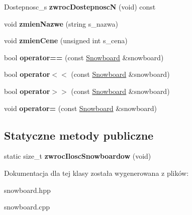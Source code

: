 \begin{DoxyCompactItemize}
\mbox{\label{class_snowboard_aaa30ba4f895aebff920ac25c5d477fd8}} 
Dostepnosc\+\_\+s {\bfseries zwroc\+DostepnoscN} (void) const
\item 
\mbox{\label{class_snowboard_a82357c21c3b6db16705afc871e79ee55}} 
void {\bfseries zmien\+Nazwe} (string s\+\_\+nazwa)
\item 
\mbox{\label{class_snowboard_a4a85e0a9b666ec2684bd924fb462948e}} 
void {\bfseries zmien\+Cene} (unsigned int s\+\_\+cena)
\item 
\mbox{\label{class_snowboard_aa8da85ff612a1916b31a281b54a134cc}} 
bool {\bfseries operator==} (const \hyperlink{class_snowboard}{Snowboard} \&snowboard)
\item 
\mbox{\label{class_snowboard_a86c206599d92e0c7b63afc3d4d2d5393}} 
bool {\bfseries operator$<$$<$} (const \hyperlink{class_snowboard}{Snowboard} \&snowboard)
\item 
\mbox{\label{class_snowboard_a1dc59ff0f8644e8aadae2c08fecde3d0}} 
bool {\bfseries operator$>$$>$} (const \hyperlink{class_snowboard}{Snowboard} \&snowboard)
\item 
\mbox{\label{class_snowboard_ad1d481630326c8bea93090791efef496}} 
void {\bfseries operator=} (const \hyperlink{class_snowboard}{Snowboard} \&snowboard)
\end{DoxyCompactItemize}
\subsection*{Statyczne metody publiczne}
\begin{DoxyCompactItemize}
\item 
\mbox{\label{class_snowboard_a424d6bd96d0949bc254bd696cbb1c6cb}} 
static size\+\_\+t {\bfseries zwroc\+Ilosc\+Snowboardow} (void)
\end{DoxyCompactItemize}


Dokumentacja dla tej klasy została wygenerowana z plików\+:\begin{DoxyCompactItemize}
\item 
snowboard.\+hpp\item 
snowboard.\+cpp\end{DoxyCompactItemize}
